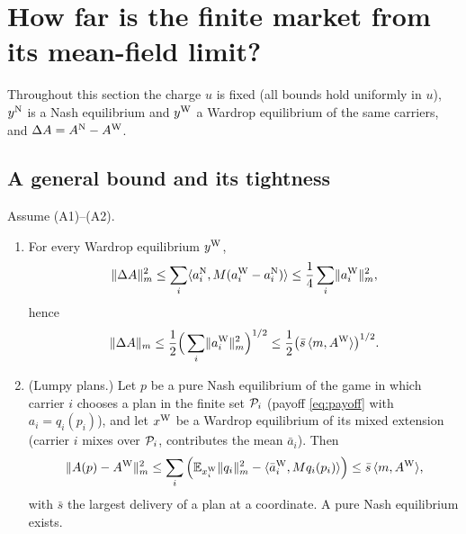 \section{How far is the finite market from its mean-field limit?}\label{sec:gap}

Throughout this section the charge $u$ is fixed (all bounds hold uniformly in $u$), $y^{\mathrm{N}}$ is a Nash equilibrium and $y^{\mathrm{W}}$ a Wardrop equilibrium of the same carriers, and $\Delta A=A^{\mathrm{N}}-A^{\mathrm{W}}$.

\subsection{A general bound and its tightness}

\begin{theorem}\label{thm:sqrt}
Assume (A1)--(A2).
\begin{enumerate}
\item[(a)] For every Wardrop equilibrium $y^{\mathrm{W}}$,
\[
\lVert \Delta A\rVert_m^2\le\sum_i\langle a_i^{\mathrm{N}},M(a_i^{\mathrm{W}}-a_i^{\mathrm{N}})\rangle\le\frac14\sum_i\lVert a_i^{\mathrm{W}}\rVert_m^2 ,
\]
hence
\[
\lVert \Delta A\rVert_m\le\frac12\Big(\sum_i\lVert a_i^{\mathrm{W}}\rVert_m^2\Big)^{1/2}\le\frac12\big(\bar s\,\langle m,A^{\mathrm{W}}\rangle\big)^{1/2}.
\]
\item[(b)] (Lumpy plans.) Let $p$ be a pure Nash equilibrium of the game in which carrier $i$ chooses a plan in the finite set $\mathcal{P}_i$ (payoff \eqref{eq:payoff} with $a_i=q_i(p_i)$), and let $x^{\mathrm{W}}$ be a Wardrop equilibrium of its mixed extension (carrier $i$ mixes over $\mathcal{P}_i$, contributes the mean $\bar a_i$). Then
\[
\lVert A(p)-A^{\mathrm{W}}\rVert_m^2\le\sum_i\Big(\mathbb{E}_{x_i^{\mathrm{W}}}\lVert q_i\rVert_m^2-\langle \bar a_i^{\mathrm{W}},Mq_i(p_i)\rangle\Big)\le\bar s\,\langle m,A^{\mathrm{W}}\rangle,
\]
with $\bar s$ the largest delivery of a plan at a coordinate. A pure Nash equilibrium exists.
\end{enumerate}
\end{theorem}
